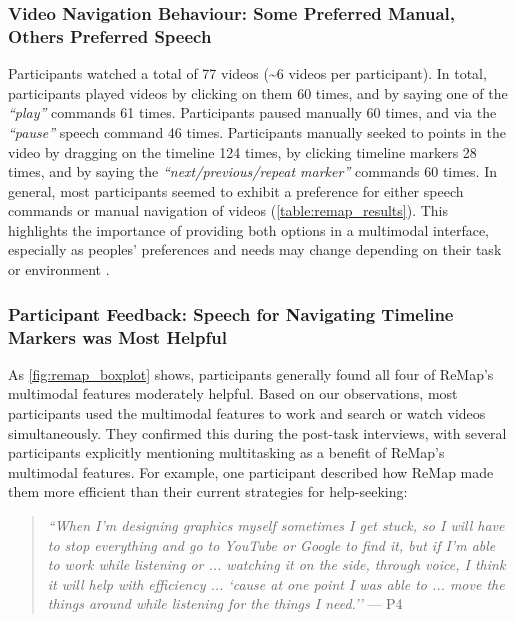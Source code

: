 \subsubsection{Video Navigation Behaviour: Some Preferred Manual, Others Preferred Speech}
Participants watched a total of 77 videos (\textasciitilde6 videos per participant). In total, participants played videos by clicking on them 60 times, and by saying one of the \textit{``play''} commands 61 times. Participants paused manually 60 times, and via the \textit{``pause''} speech command 46 times. Participants manually seeked to points in the video by dragging on the timeline 124 times, by clicking timeline markers 28 times, and by saying the \textit{``next/previous/repeat marker''} commands 60 times. In general, most participants seemed to exhibit a preference for either speech commands or manual navigation of videos (\autoref{table:remap_results}). This highlights the importance of providing both options in a multimodal interface, especially as peoples' preferences and needs may change depending on their task or environment \cite{Reeves2004, LaViolaJr.2014}.

\subsubsection{Participant Feedback: Speech for Navigating Timeline Markers was Most Helpful}
As \autoref{fig:remap_boxplot} shows, participants generally found all four of ReMap's multimodal features moderately helpful. Based on our observations, most participants used the multimodal features to work and search or watch videos simultaneously. They confirmed this during the post-task interviews, with several participants explicitly mentioning multitasking as a benefit of ReMap's multimodal features. For example, one participant described how ReMap made them more efficient than their current strategies for help-seeking:

\begin{quote}
\textit{``When I'm designing graphics myself sometimes I get stuck, so I will have to stop everything and go to YouTube or Google to find it, but if I'm able to work while listening or ... watching it on the side, through voice, I think it will help with efficiency ... `cause at one point I was able to ... move the things around while listening for the things I need.''} --- P4
\end{quote}

